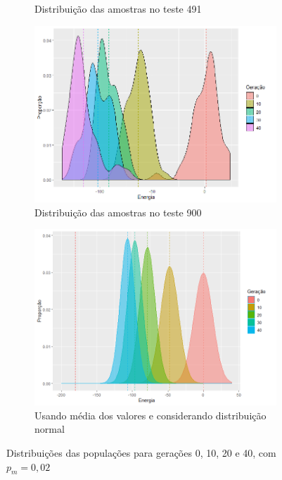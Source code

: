 \begin{figure}[h!]
\begin{subfigure}[b]{0.47\linewidth}
		\caption{Distribuição das amostras no teste 491}
	\end{subfigure}
	\begin{subfigure}[b]{0.47\linewidth}
		\includegraphics[width=\linewidth]{imagens/distribuicao_t900.png}
		\caption{Distribuição das amostras no teste 900}
	\end{subfigure}
	\begin{subfigure}[b]{0.47\linewidth}
		\includegraphics[width=\linewidth]{imagens/Distribuicao_medias.png}
		\caption{Usando média dos valores e considerando distribuição normal}
	\end{subfigure}
	\caption{Distribuições das populações para gerações 0, 10, 20 e 40, com \(p_m=0,02\)}
	\label{fig:distribuicao_ising_1}
\end{figure}


